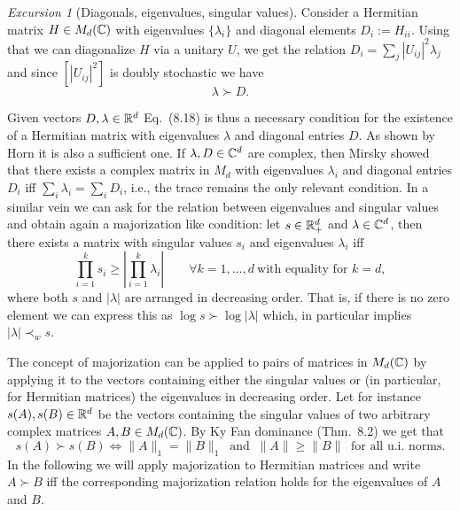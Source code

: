 \documentclass[11pt,a4paper]{article}
\theoremstyle{plain}
\theoremstyle{definition}
\theoremstyle{remark}
\newtheorem{excursion}{Excursion}[section]
\begin{document}
\begin{excursion}[Diagonals, eigenvalues, singular values]
    Consider a Hermitian matrix $H\in M_d(\mathbb{C})$ with eigenvalues $\{\lambda_i\}$ and diagonal elements $D_i:=H_{ii}$. Using that we can diagonalize $H$ via a unitary $U$, we get the relation
    $D_i=\sum_j |U_{ij}|^2\lambda_j$ and since $[|U_{ij}|^2]$ is doubly stochastic we have
    \begin{equation}\tag{8.18}
        \lambda \succ D.
    \end{equation}
\end{excursion}


Given vectors $D,\lambda\in\mathbb{R}^d$ Eq.~(8.18) is thus a necessary condition for the existence of a Hermitian matrix with eigenvalues
$\lambda$ and diagonal entries $D$. As shown by Horn it is also a sufficient one. If $\lambda,D\in\mathbb{C}^d$ are complex, then Mirsky showed
that there exists a complex matrix in $M_d$ with eigenvalues $\lambda_i$ and diagonal entries $D_i$ iff $\sum_i \lambda_i=\sum_i D_i$,
i.e., the trace remains the only relevant condition. In a similar vein we can ask for the relation between eigenvalues and singular values
and obtain again a majorization like condition: let $s\in\mathbb{R}_+^d$ and $\lambda\in\mathbb{C}^d$, then there exists a matrix with singular values
$s_i$ and eigenvalues $\lambda_i$ iff
\begin{equation}\tag{8.19}
    \prod_{i=1}^k s_i \ge \left|\prod_{i=1}^k \lambda_i\right|
    \qquad \forall k=1,\dots,d\ \text{with equality for }k=d,
\end{equation}
where both $s$ and $|\lambda|$ are arranged in decreasing order. That is, if there is no zero element we can express this as
$\log s \succ \log|\lambda|$ which, in particular implies $|\lambda|\prec_w s$.

The concept of majorization can be applied to pairs of matrices in $M_d(\mathbb{C})$ by applying it to the vectors containing either the singular
values or (in particular, for Hermitian matrices) the eigenvalues in decreasing order. Let for instance $s(A),s(B)\in\mathbb{R}^d$ be the vectors
containing the singular values of two arbitrary complex matrices $A,B\in M_d(\mathbb{C})$. By Ky Fan dominance (Thm.~8.2) we get that
\begin{equation}\tag{8.20}
    s(A)\succ s(B)\iff \|A\|_1=\|B\|_1\ \text{ and }\ \|A\|\ge \|B\|\ \text{ for all u.i.\ norms.}
\end{equation}
In the following we will apply majorization to Hermitian matrices and write $A\succ B$ iff the corresponding majorization relation holds
for the eigenvalues of $A$ and $B$.
\end{document}
